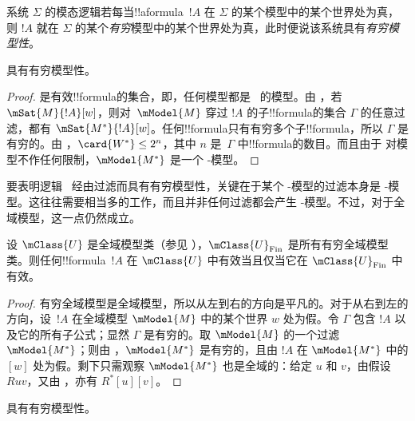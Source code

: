 \documentclass[../../../include/open-logic-section]{subfiles}
\begin{document}


\begin{defn}
  系统 $\Sigma$ 的模态逻辑若每当!!a{formula}~$!A$ 在 $\Sigma$ 的某个模型中的某个世界处为真，则 $!A$ 就在 $\Sigma$ 的某个\emph{有穷}模型中的某个世界处为真，此时便说该系统具有\emph{有穷模型性}。
\end{defn}

\begin{prop}
   具有有穷模型性。
\end{prop}

\begin{proof}
   是有效!!{formula}的集合，即，任何模型都是~ 的模型。由 ，若 $\mSat{M}{!A}[w]$，则对~$\mModel{M}$ 穿过 $!A$ 的子!!{formula}的集合 $\Gamma$ 的任意过滤，都有 $\mSat{M^*}{!A}[w]$。任何!!{formula}只有有穷多个子!!{formula}，所以 $\Gamma$ 是有穷的。由 ，$\card{W^*} \le 2^n$，其中 $n$ 是~$\Gamma$ 中!!{formula}的数目。而且由于  对模型不作任何限制，$\mModel{M^*}$ 是一个 -模型。
\end{proof}

要表明逻辑~ 经由过滤而具有有穷模型性，关键在于某个 -模型的过滤本身是 -模型。这往往需要相当多的工作，而且并非任何过滤都会产生 -模型。不过，对于全域模型，这一点仍然成立。

\begin{prop}
  设 $\mClass{U}$ 是全域模型类（参见 ），$\mClass{U}_\mathrm{Fin}$ 是所有有穷全域模型类。则任何!!{formula}~$!A$ 在 $\mClass{U}$ 中有效当且仅当它在 $\mClass{U}_\mathrm{Fin}$ 中有效。
\end{prop}

\begin{proof}
  有穷全域模型是全域模型，所以从左到右的方向是平凡的。对于从右到左的方向，设~$!A$ 在全域模型 $\mModel{M}$ 中的某个世界 $w$ 处为假。令 $\Gamma$ 包含 $!A$ 以及它的所有子公式；显然 $\Gamma$ 是有穷的。取 $\mModel{M}$ 的一个过滤 $\mModel{M^*}$；则由 ，$\mModel{M^*}$ 是有穷的，且由 $!A$ 在 $\mModel{M^*}$ 中的 $[w]$ 处为假。剩下只需观察 $\mModel{M^*}$ 也是全域的：给定 $u$ 和 $v$，由假设 $Ruv$，又由 ，亦有 $R^*[u][v]$。
\end{proof}

\begin{cor}
   具有有穷模型性。
\end{cor}
\end{document}
